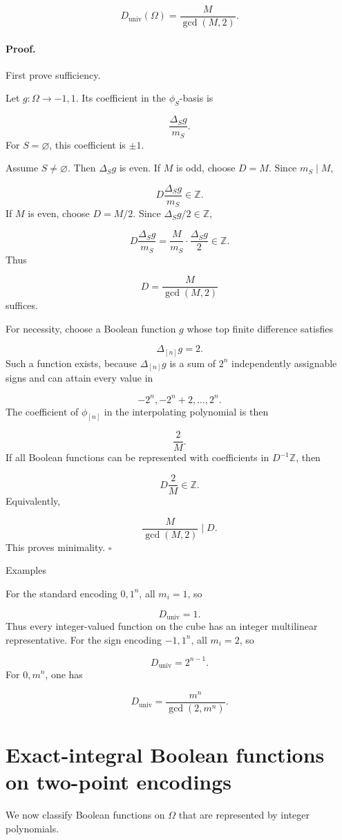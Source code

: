\documentclass[11pt]{article}
\theoremstyle{definition}
\begin{document}
\[
D_{\mathrm{univ}}(\Omega)
=
\frac{M}{\gcd(M,2)}.
\]
\paragraph{Proof.}
First prove sufficiency.

Let $g:\Omega\to{-1,1}$. Its coefficient in the $\phi_S$-basis is

\[
\frac{\Delta_Sg}{m_S}.
\]
For $S=\varnothing$, this coefficient is $\pm1$.

Assume $S\ne\varnothing$. Then $\Delta_Sg$ is even. If $M$ is odd, choose $D=M$. Since $m_S\mid M$,

\[
D\frac{\Delta_Sg}{m_S}\in\mathbb{Z}.
\]
If $M$ is even, choose $D=M/2$. Since $\Delta_Sg/2\in\mathbb{Z}$,

\[
D\frac{\Delta_Sg}{m_S}
=
\frac{M}{m_S}\cdot \frac{\Delta_Sg}{2}
\in\mathbb{Z}.
\]
Thus

\[
D=\frac{M}{\gcd(M,2)}
\]
suffices.

For necessity, choose a Boolean function $g$ whose top finite difference satisfies

\[
\Delta_{[n]}g=2.
\]
Such a function exists, because $\Delta_{[n]}g$ is a sum of $2^n$ independently assignable signs and can attain every value in

\[
{-2^n,-2^n+2,\dots,2^n}.
\]
The coefficient of $\phi_{[n]}$ in the interpolating polynomial is then

\[
\frac{2}{M}.
\]
If all Boolean functions can be represented with coefficients in $D^{-1}\mathbb{Z}$, then

\[
D\frac{2}{M}\in\mathbb{Z}.
\]
Equivalently,

\[
\frac{M}{\gcd(M,2)}\mid D.
\]
This proves minimality. $\square$

Examples

For the standard encoding ${0,1}^n$, all $m_i=1$, so

\[
D_{\mathrm{univ}}=1.
\]
Thus every integer-valued function on the cube has an integer multilinear representative. For the sign encoding ${-1,1}^n$, all $m_i=2$, so

\[
D_{\mathrm{univ}}=2^{n-1}.
\]
For ${0,m}^n$, one has

\[
D_{\mathrm{univ}}=
\frac{m^n}{\gcd(2,m^n)}.
\]
\section{Exact-integral Boolean functions on two-point encodings}
We now classify Boolean functions on $\Omega$ that are represented by integer polynomials.
\end{document}
